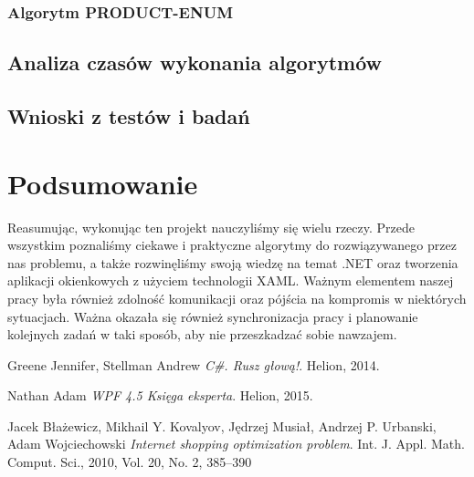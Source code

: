 \documentclass[a4paper]{article}
\let\oldsection\section
\renewcommand\section{\clearpage\oldsection}
\begin{document}
\subsubsection{Algorytm PRODUCT-ENUM}
\subsection{Analiza czasów wykonania algorytmów}
\subsection{Wnioski z testów i badań}

\section{Podsumowanie}
Reasumując, wykonując ten projekt nauczyliśmy się wielu rzeczy. Przede wszystkim poznaliśmy ciekawe i praktyczne algorytmy do rozwiązywanego przez nas problemu, a także rozwinęliśmy swoją wiedzę na temat .NET oraz tworzenia aplikacji okienkowych z użyciem technologii XAML. Ważnym elementem naszej pracy była również zdolność komunikacji oraz pójścia na kompromis w niektórych sytuacjach. Ważna okazała się również synchronizacja pracy i planowanie kolejnych zadań w taki sposób, aby nie przeszkadzać sobie nawzajem.
\begin{thebibliography}{9}

  Greene Jennifer, Stellman Andrew 
  \emph{C\#. Rusz głową!}.
  Helion,
  2014.
  
	Nathan Adam
	\emph{WPF 4.5 Księga eksperta}. Helion, 2015.  
  
	Jacek Błażewicz, Mikhail Y. Kovalyov, Jędrzej Musiał, Andrzej P. Urbanski, Adam Wojciechowski
	\emph{Internet shopping optimization problem}.
	Int. J. Appl. Math. Comput. Sci., 2010, Vol. 20, No. 2, 385–390 
	
  \end{thebibliography}
\end{document}
